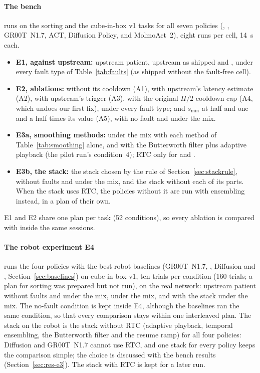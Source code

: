\paragraph{The bench} runs on the sorting and the cube-in-box v1 tasks for all seven policies (\smolvla, \groot,
GR00T~N1.7, ACT, Diffusion Policy, \pizerofive{} and MolmoAct~2), eight runs per cell, 14~s each.
\begin{itemize}
\item \textbf{E1, \drtc{} against upstream:} upstream patient, upstream as shipped and \drtc, under every fault type of
      Table~\ref{tab:faults} (as shipped without the fault-free cell).
\item \textbf{E2, ablations:} \drtc{} without its cooldown (A1), with upstream's latency estimate (A2), with upstream's
      trigger (A3), with the original $H/2$ cooldown cap (A4, which undoes our first fix), under every fault type; and
      $s_{\min}$ at half and one and a half times its value (A5), with no fault and under the mix.
\item \textbf{E3a, smoothing methods:} \drtc{} under the mix with each method of Table~\ref{tab:smoothing} alone, and
      with the Butterworth filter plus adaptive playback (the pilot run's condition~4); RTC only for \smolvla{} and
      \groot.
\item \textbf{E3b, the stack:} the stack chosen by the rule of Section~\ref{sec:stackrule}, without faults and under the
      mix, and the stack without each of its parts. When the stack uses RTC, the policies without it are run with
      ensembling instead, in a plan of their own.
\end{itemize}
E1 and E2 share one plan per task (52 conditions), so every ablation is compared with \drtc{} inside the same sessions.

\paragraph{The robot experiment E4} runs the four policies with the best robot baselines (GR00T~N1.7, \smolvla,
Diffusion and \pizerofive, Section~\ref{sec:baselines}) on cube in box v1, ten trials per condition (160 trials; a
plan for sorting was prepared but not run),
on the real network: upstream patient without faults and under the mix, \drtc{} under the mix, and \drtc{} with the
stack under the mix. The no-fault condition is kept inside E4, although the baselines ran the same condition, so that
every comparison stays within one interleaved plan. The stack on the robot is the stack without RTC (adaptive playback,
temporal ensembling, the Butterworth filter and the resume ramp) for all four policies: Diffusion and GR00T~N1.7 cannot
use RTC, and one stack for every policy keeps the comparison simple; the choice is discussed with the bench results
(Section~\ref{sec:res-e3}). The stack with RTC is kept for a later run.

